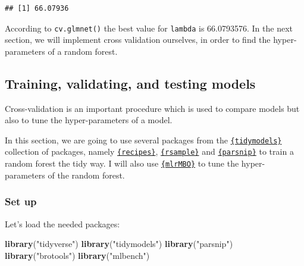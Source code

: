 \documentclass[]{gitbook}
\newenvironment{Shaded}{\begin{snugshade}}{\end{snugshade}}
\newcommand{\CommentTok}[1]{\textcolor[rgb]{0.56,0.35,0.01}{\textit{#1}}}
\newcommand{\KeywordTok}[1]{\textcolor[rgb]{0.13,0.29,0.53}{\textbf{#1}}}
\newcommand{\NormalTok}[1]{#1}
\newcommand{\OperatorTok}[1]{\textcolor[rgb]{0.81,0.36,0.00}{\textbf{#1}}}
\newcommand{\StringTok}[1]{\textcolor[rgb]{0.31,0.60,0.02}{#1}}
\begin{document}
\begin{Shaded}
\end{Shaded}

\begin{verbatim}
## [1] 66.07936
\end{verbatim}

According to \texttt{cv.glmnet()} the best value for \texttt{lambda} is 66.0793576. In the
next section, we will implement cross validation ourselves, in order to find the hyper-parameters
of a random forest.

\hypertarget{training-validating-and-testing-models}{%
\subsection{Training, validating, and testing models}\label{training-validating-and-testing-models}}

Cross-validation is an important procedure which is used to compare models but also to tune the
hyper-parameters of a model.

In this section, we are going to use several packages from the
\href{https://github.com/tidymodels}{\texttt{\{tidymodels\}}} collection of packages, namely
\href{https://tidymodels.github.io/recipes/}{\texttt{\{recipes\}}},
\href{https://tidymodels.github.io/rsample/}{\texttt{\{rsample\}}} and
\href{https://tidymodels.github.io/parsnip/}{\texttt{\{parsnip\}}} to train a random forest the tidy way. I will
also use \href{http://mlrmbo.mlr-org.com/}{\texttt{\{mlrMBO\}}} to tune the hyper-parameters of the random forest.

\hypertarget{set-up}{%
\subsubsection{Set up}\label{set-up}}

Let's load the needed packages:

\begin{Shaded}
\begin{Highlighting}[]
\KeywordTok{library}\NormalTok{(}\StringTok{"tidyverse"}\NormalTok{)}
\KeywordTok{library}\NormalTok{(}\StringTok{"tidymodels"}\NormalTok{)}
\KeywordTok{library}\NormalTok{(}\StringTok{"parsnip"}\NormalTok{)}
\KeywordTok{library}\NormalTok{(}\StringTok{"brotools"}\NormalTok{)}
\KeywordTok{library}\NormalTok{(}\StringTok{"mlbench"}\NormalTok{)}
\end{Highlighting}
\end{Shaded}
\end{document}
